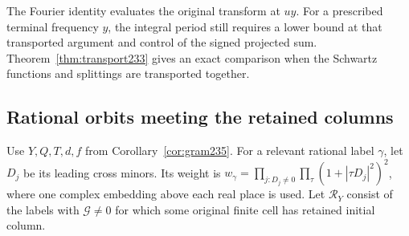 \documentclass[a4paper,11pt]{article}
\theoremstyle{definition}
\theoremstyle{remark}
\numberwithin{equation}{section}
\begin{document}
The Fourier identity evaluates the original transform at \(uy\).
For a prescribed terminal frequency \(y\), the integral period still
requires a lower bound at that transported argument and control of
the signed projected sum. Theorem~\ref{thm:transport233} gives an exact comparison when the Schwartz functions and splittings are transported together.

\subsection{Rational orbits meeting the retained columns}\label{nav:VIII-31}
Use \(Y,Q,T,d,f\) from Corollary~\ref{cor:gram235}. For a
relevant rational label \(\gamma\), let \(D_j\) be its leading
cross minors. Its weight is
\(w_\gamma=\prod_{j:D_j\ne0}\prod_\tau(1+|\tau D_j|^2)^2\),
where one complex embedding above each real place is used. Let
\(\mathcal R_Y\) consist of the labels with \(\mathcal G\ne0\)
for which some original finite cell has retained initial column.
\end{document}
